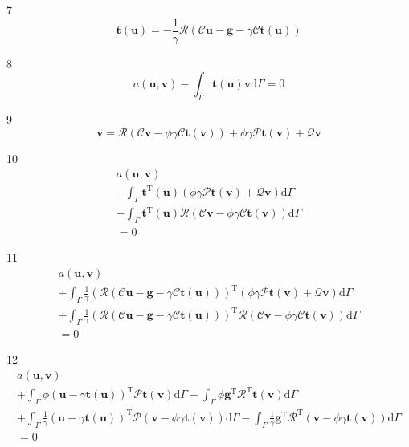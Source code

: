 \documentclass[a4paper,12pt]{article}
\begin{document}
7
\begin{equation}
\mathbf{t}(\mathbf{u}) =
-\frac{1}{\gamma}
\mathcal{R}(\mathcal{C}\mathbf{u}-\mathbf{g}-\gamma\mathcal{C}\mathbf{t}(\mathbf{u}))
\end{equation}

8
\begin{equation}
a(\mathbf{u},\mathbf{v}) - \int_\Gamma \mathbf{t}(\mathbf{u})\mathbf{v} \textrm{d}\Gamma = 0
\end{equation}

9
\begin{equation}
\mathbf{v} =
\mathcal{R}(\mathcal{C}\mathbf{v}-\phi\gamma\mathcal{C}\mathbf{t}(\mathbf{v}))
+\phi\gamma\mathcal{P}\mathbf{t}(\mathbf{v}) + \mathcal{Q}\mathbf{v}
\end{equation}

10
\begin{equation}
\begin{split}
a(\mathbf{u},\mathbf{v})
\\-
\int_\Gamma
\mathbf{t}^{\textrm{T}}(\mathbf{u})
(
\phi\gamma\mathcal{P}\mathbf{t}(\mathbf{v})
+
\mathcal{Q}\mathbf{v}
)
\textrm{d}\Gamma
\\-
\int_\Gamma
\mathbf{t}^\textrm{T}(\mathbf{u})
\mathcal{R}(\mathcal{C}\mathbf{v}-\phi\gamma\mathcal{C}\mathbf{t}(\mathbf{v}))
\textrm{d}\Gamma
\\=
0
\end{split}
\end{equation}

11
\begin{equation}
\begin{split}
a(\mathbf{u},\mathbf{v})
\\+
\int_\Gamma
\frac{1}{\gamma}
(
\mathcal{R}(\mathcal{C}\mathbf{u}-\mathbf{g}-\gamma\mathcal{C}\mathbf{t}(\mathbf{u}))
)^\textrm{T}
(\phi\gamma\mathcal{P}\mathbf{t}(\mathbf{v})+\mathcal{Q}\mathbf{v})
\textrm{d}\Gamma
\\+
\int_\Gamma
\frac{1}{\gamma}
(
\mathcal{R}(\mathcal{C}\mathbf{u}-\mathbf{g}-\gamma\mathcal{C}\mathbf{t}(\mathbf{u}))
)^\textrm{T}
\mathcal{R}(\mathcal{C}\mathbf{v}-\phi\gamma\mathcal{C}\mathbf{t}(\mathbf{v}))
\textrm{d}\Gamma
\\=
0
\end{split}
\end{equation}

12
\begin{equation}
\begin{split}
a(\mathbf{u},\mathbf{v})
\\+
\int_\Gamma
\phi
(
\mathbf{u}-\gamma\mathbf{t}(\mathbf{u})
)^\textrm{T}\mathcal{P}
\mathbf{t}(\mathbf{v})
\textrm{d}\Gamma
-
\int_\Gamma
\phi
\mathbf{g}^\textrm{T}\mathcal{R}^\textrm{T}
\mathbf{t}(\mathbf{v})
\textrm{d}\Gamma
\\+
\int_\Gamma
\frac{1}{\gamma}
(
\mathbf{u}-\gamma\mathbf{t}(\mathbf{u})
)^\textrm{T}\mathcal{P}
(\mathbf{v}-\phi\gamma\mathbf{t}(\mathbf{v}))
\textrm{d}\Gamma
-
\int_\Gamma
\frac{1}{\gamma}
\mathbf{g}^\textrm{T}\mathcal{R}^\textrm{T}
(\mathbf{v}-\phi\gamma\mathbf{t}(\mathbf{v}))
\textrm{d}\Gamma
\\=
0
\end{split}
\end{equation}
\end{document}

